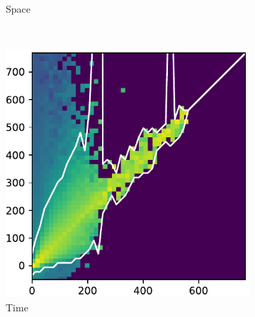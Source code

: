 \documentclass[10pt,letterpaper]{article}
\begin{document}
\begin{figure}[h!]
\begin{subfigure}[t]{0.288\textwidth}
						\caption{Space}
					\end{subfigure}
					~ 
					\begin{subfigure}[t]{0.288\textwidth}
						\centering
						\includegraphics[width=\textwidth]{fig/hist_2}
						\caption{Time}
					\end{subfigure}
					~ 
					\begin{subfigure}[t]{0.079\textwidth}
						\centering

\end{subfigure}
\end{figure}
\end{document}
